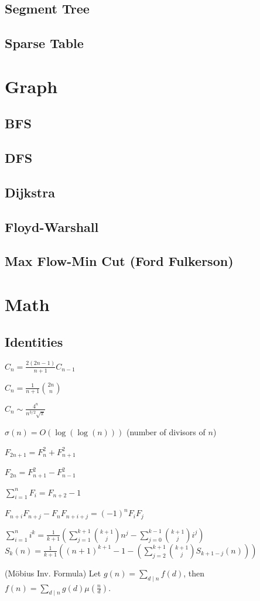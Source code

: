 \subsection{Segment Tree}
\subsection{Sparse Table}
\newpage
\section{Graph}
\subsection{BFS}
\subsection{DFS}
\subsection{Dijkstra}
\subsection{Floyd-Warshall}
\subsection{Max Flow-Min Cut (Ford Fulkerson)}




\newpage
\section{Math}
\subsection{Identities}
{
$C_n = \frac{2(2n-1)}{n+1} C_{n-1}$

$C_n = \frac{1}{n+1} \binom{2n}{n}$

$C_n \sim \frac{4^n}{n^{3/2}\sqrt{\pi}}$

$\sigma(n) = O(\log(\log(n)))$ (number of divisors of $n$)

$F_{2n+1} = F_{n}^2 + F_{n+1}^2$

$F_{2n} = F_{n+1}^2 - F_{n-1}^2$

$\sum_{i=1}^n F_i = F_{n+2}-1$

$F_{n+i}F_{n+j} - F_nF_{n+i+j} = (-1)^n F_iF_j$

$\sum_{i=1}^{n} i^k = \frac{1}{k+1}(\sum_{j=1}^{k+1}\binom{k+1}{j}n^j-\sum_{j=0}^{k-1}\binom{k+1}{j}i^j)$
$S_k(n)= \frac{1}{k+1}((n+1)^{k+1}-1-(\sum_{j=2}^{k+1}\binom{k+1}{j}S_{k+1-j}(n)))$

(Möbius Inv. Formula)
Let $g(n) = \sum_{d\mid n} f(d)$, then $f(n)=\sum_{d\mid n} g(d) \mu\left(\frac{n}{d}\right)$.
}
